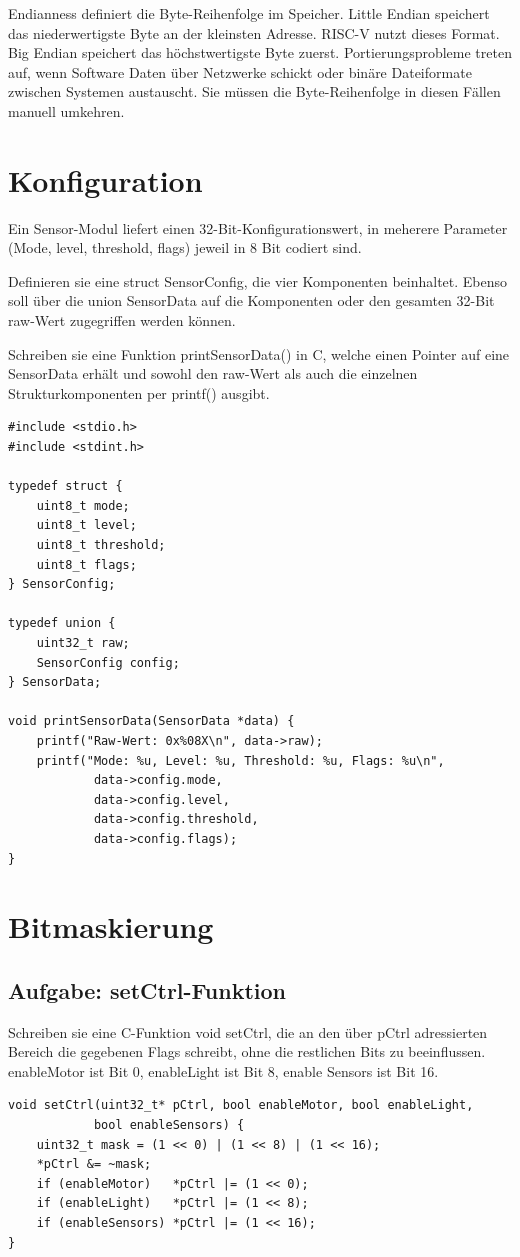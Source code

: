 \documentclass[12pt,a4paper]{article}
\begin{document}
Endianness definiert die Byte-Reihenfolge im Speicher. Little Endian speichert das niederwertigste Byte an der kleinsten Adresse. 
RISC-V nutzt dieses Format. Big Endian speichert das höchstwertigste Byte zuerst. Portierungsprobleme treten auf, 
wenn Software Daten über Netzwerke schickt oder binäre Dateiformate zwischen Systemen austauscht. 
Sie müssen die Byte-Reihenfolge in diesen Fällen manuell umkehren.

\newpage
\section{Konfiguration}
Ein Sensor-Modul liefert einen 32-Bit-Konfigurationswert, in meherere Parameter (Mode, level, threshold, flags) jeweil in 8 Bit codiert sind.

Definieren sie eine struct SensorConfig, die vier Komponenten beinhaltet. Ebenso soll über die union SensorData auf die Komponenten oder den gesamten
32-Bit raw-Wert zugegriffen werden können.

Schreiben sie eine Funktion printSensorData() in C, welche einen Pointer auf eine SensorData erhält und sowohl den raw-Wert als auch die einzelnen
Strukturkomponenten per printf() ausgibt.

\begin{lstlisting}
#include <stdio.h>
#include <stdint.h>

typedef struct {
    uint8_t mode;
    uint8_t level;
    uint8_t threshold;
    uint8_t flags;
} SensorConfig;

typedef union {
    uint32_t raw;
    SensorConfig config;
} SensorData;

void printSensorData(SensorData *data) {
    printf("Raw-Wert: 0x%08X\n", data->raw);
    printf("Mode: %u, Level: %u, Threshold: %u, Flags: %u\n", 
            data->config.mode, 
            data->config.level, 
            data->config.threshold, 
            data->config.flags);
}
\end{lstlisting}

\newpage
\section{Bitmaskierung}

\subsection{Aufgabe: setCtrl-Funktion}
Schreiben sie eine C-Funktion void setCtrl, die an den über pCtrl adressierten Bereich die gegebenen Flags schreibt, ohne die restlichen Bits zu beeinflussen.
enableMotor ist Bit 0, enableLight ist Bit 8, enable Sensors ist Bit 16.
\begin{lstlisting}
void setCtrl(uint32_t* pCtrl, bool enableMotor, bool enableLight, 
            bool enableSensors) {
    uint32_t mask = (1 << 0) | (1 << 8) | (1 << 16);
    *pCtrl &= ~mask; 
    if (enableMotor)   *pCtrl |= (1 << 0);
    if (enableLight)   *pCtrl |= (1 << 8);
    if (enableSensors) *pCtrl |= (1 << 16);
}
\end{lstlisting}
\end{document}
